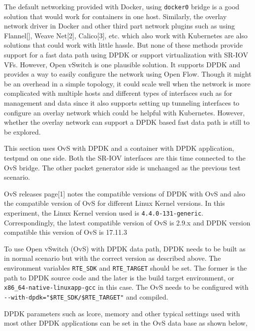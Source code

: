 \documentclass[english, 12pt, a4paper, elec, utf8, a-1b, online]{aaltothesis}
\begin{document}
The default networking provided with Docker, using \lstinline{docker0} bridge is a good solution that would work for containers in one host. Similarly, the overlay network driver in Docker and other third part network plugins such as using Flannel[], Weave Net[2], Calico[3], etc. which also work with Kubernetes are also solutions that could work with little hassle. But none of these methods provide support for a fast data path using DPDK or support virtualization with SR-IOV VFs. However, Open vSwitch is one plausible solution. It supports DPDK and provides a way to easily configure the network using Open Flow. Though it might be an overhead in a simple topology, it could scale well when the network is more complicated with multiple hosts and different types of interfaces such as for management and data since it also supports setting up tunneling interfaces to configure an overlay network which could be helpful with Kubernetes. However, whether the overlay network can support a DPDK based fast data path is still to be explored.

This section uses OvS with DPDK and a container with DPDK application, testpmd on one side. Both the SR-IOV interfaces are this time connected to the OvS bridge. The other packet generator side is unchanged as the previous test scenario.

OvS releases page[1] notes the compatible versions of DPDK with OvS and also the compatible version of OvS for different Linux Kernel versions. In this experiment, the Linux Kernel version used is \lstinline{4.4.0-131-generic}. Correspondingly, the latest compatible version of OvS is 2.9.x and DPDK version compatible this version of OvS is 17.11.3

To use Open vSwitch (OvS) with DPDK data path, DPDK needs to be built as in normal scenario but with the correct version as described above. The environment variables \lstinline{RTE_SDK} and \lstinline{RTE_TARGET} should be set. The former is the path to DPDK source code and the later is the build target environment, or \lstinline{x86_64-native-linuxapp-gcc} in this case. The OvS needs to be configured with \lstinline{--with-dpdk="$RTE_SDK/$RTE_TARGET"} and compiled.

DPDK parameters such as lcore, memory and other typical settings used with most other DPDK applications can be set in the OvS data base as shown below,
\end{document}

